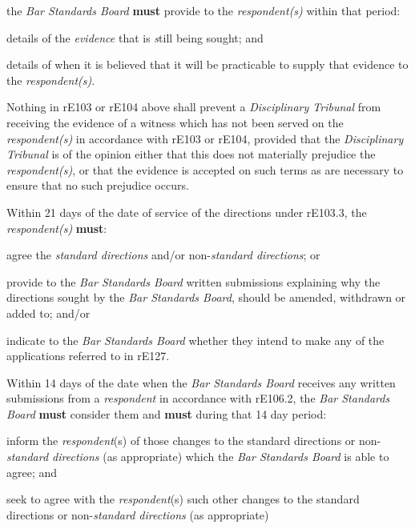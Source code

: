 the \emph{Bar Standards Board}  \textcolor{myred}{\textbf{must}} provide to
the \emph{respondent(s)} within that period:\\\nl \item details of the \emph{evidence }that is \emph{s}till being sought;
and\item details of when it is believed that it will be practicable to supply
that evidence to the \emph{respondent(s)}.\ln
{}\par
Nothing in rE103 or rE104 above shall prevent a \emph{Disciplinary
Tribunal} from receiving the evidence of a witness which has not been
served on the \emph{respondent(s) }in accordance with \textbf{ } rE103
or rE104, provided that the \emph{Disciplinary Tribunal} is of the
opinion either that this does not materially prejudice
the \emph{respondent(s)}, or that the evidence is accepted on such terms
as are necessary to ensure that no such prejudice occurs.\\
\par
{}
Within 21 days of the date of service of the directions under rE103.3,
the \emph{respondent(s)}  \textcolor{myred}{\textbf{must}}:\\\nl \item agree the \emph{standard directions} and/or non-\emph{standard
directions}; or\item provide to the \emph{Bar Standards Board} written submissions
explaining why the directions sought by the \emph{Bar Standards Board},
should be amended, withdrawn or added to; and/or\item indicate to the \emph{Bar Standards Board} whether they intend to
make any of the applications referred to in rE127.\ln
{}\par
Within 14 days of the date when the \emph{Bar Standards Board} receives
any written submissions from a \emph{respondent} in accordance with
rE106.2, the \emph{Bar Standards Board}  \textcolor{myred}{\textbf{must}} consider them and  \textcolor{myred}{\textbf{must}}
during that 14 day period:\\\nl \item inform the \emph{respondent}(s) of those changes to the standard
directions or non-\emph{standard directions} (as appropriate) which
the \emph{Bar Standards Board} is able to agree; and\item seek to agree with the \emph{respondent}(s) such other changes to the
standard directions or non-\emph{standard directions} (as appropriate)
